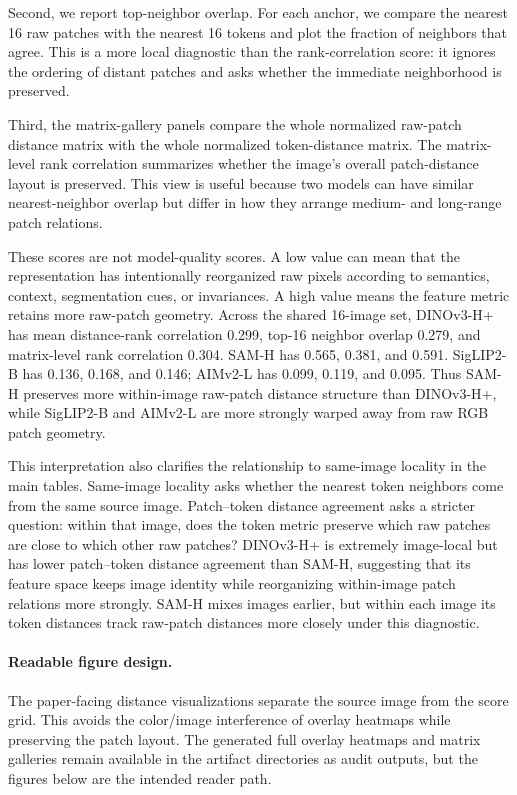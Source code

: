Second, we report top-neighbor overlap. For each anchor, we compare the nearest 16 raw patches with the nearest 16 tokens and plot the fraction of neighbors that agree. This is a more local diagnostic than the rank-correlation score: it ignores the ordering of distant patches and asks whether the immediate neighborhood is preserved.

Third, the matrix-gallery panels compare the whole normalized raw-patch distance matrix with the whole normalized token-distance matrix. The matrix-level rank correlation summarizes whether the image's overall patch-distance layout is preserved. This view is useful because two models can have similar nearest-neighbor overlap but differ in how they arrange medium- and long-range patch relations.

These scores are not model-quality scores. A low value can mean that the representation has intentionally reorganized raw pixels according to semantics, context, segmentation cues, or invariances. A high value means the feature metric retains more raw-patch geometry. Across the shared 16-image  set, DINOv3-H+ has mean distance-rank correlation 0.299, top-16 neighbor overlap 0.279, and matrix-level rank correlation 0.304. SAM-H has 0.565, 0.381, and 0.591. SigLIP2-B has 0.136, 0.168, and 0.146; AIMv2-L has 0.099, 0.119, and 0.095. Thus SAM-H preserves more within-image raw-patch distance structure than DINOv3-H+, while SigLIP2-B and AIMv2-L are more strongly warped away from raw RGB patch geometry.

This interpretation also clarifies the relationship to same-image locality in the main tables. Same-image locality asks whether the nearest token neighbors come from the same source image. Patch--token distance agreement asks a stricter question: within that image, does the token metric preserve which raw patches are close to which other raw patches? DINOv3-H+ is extremely image-local but has lower patch--token distance agreement than SAM-H, suggesting that its feature space keeps image identity while reorganizing within-image patch relations more strongly. SAM-H mixes images earlier, but within each image its token distances track raw-patch distances more closely under this diagnostic.

\paragraph{Readable figure design.}
The paper-facing distance visualizations separate the source image from the score grid. This avoids the color/image interference of overlay heatmaps while preserving the patch layout. The generated full overlay heatmaps and matrix galleries remain available in the artifact directories as audit outputs, but the figures below are the intended reader path.

